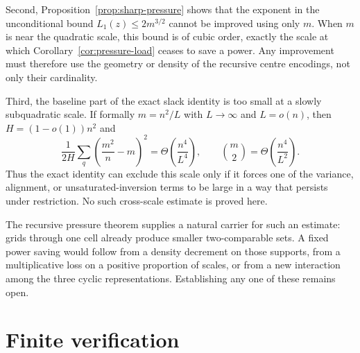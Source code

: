 \documentclass[11pt]{article}
\numberwithin{equation}{section}
\theoremstyle{definition}
\theoremstyle{remark}
\begin{document}
Second, Proposition~\ref{prop:sharp-pressure} shows that the exponent in the
unconditional bound $L_1(z)\le2m^{3/2}$ cannot be improved using only $m$.
When $m$ is near the quadratic scale, this bound is of cubic order, exactly
the scale at which Corollary~\ref{cor:pressure-load} ceases to save a power.
Any improvement must therefore use the geometry or density of the recursive
centre encodings, not only their cardinality.

Third, the baseline part of the exact slack identity is too small at a
slowly subquadratic scale.  If formally $m=n^2/L$ with $L\to\infty$ and
$L=o(n)$, then $H=(1-o(1))n^2$ and
\[
 \frac{1}{2H}\sum_q\left(\frac{m^2}{n}-m\right)^2
 =\Theta\!\left(\frac{n^4}{L^4}\right),
 \qquad
 \binom m2=\Theta\!\left(\frac{n^4}{L^2}\right).
\]
Thus the exact identity can exclude this scale only if it forces one of the
variance, alignment, or unsaturated-inversion terms to be large in a way that
persists under restriction.  No such cross-scale estimate is proved here.

The recursive pressure theorem supplies a natural carrier for such an
estimate: grids through one cell already produce smaller two-comparable sets.
A fixed power saving would follow from a density decrement on those supports,
from a multiplicative loss on a positive proportion of scales, or from a new
interaction among the three cyclic representations.  Establishing any one of
these remains open.

\appendix

\section{Finite verification}
\label{app:verification}
\end{document}
